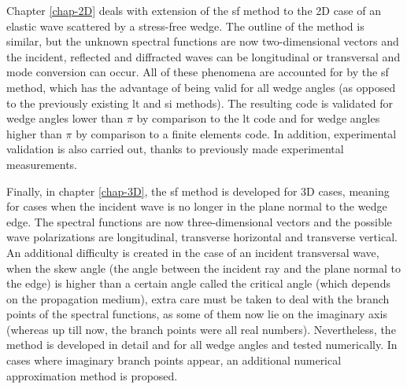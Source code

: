Chapter \ref{chap-2D} deals with extension of the \acrlong{sf} method to the 2D case of an elastic wave scattered by a stress-free wedge. The outline of the method is similar, but the unknown spectral functions are now two-dimensional vectors and the incident, reflected and diffracted waves can be longitudinal or transversal and mode conversion can occur. All of these phenomena are accounted for by the \acrlong{sf} method, which has the advantage of being valid for all wedge angles (as opposed to the previously existing \acrfull{lt} and \acrfull{si} methods). The resulting code is validated for wedge angles lower than $\pi$ by comparison to the \acrshort{lt} code and for wedge angles higher than $\pi$ by comparison to a finite elements code. In addition, experimental validation is also carried out, thanks to previously made experimental measurements.

Finally, in chapter \ref{chap-3D}, the \acrlong{sf} method is developed for 3D cases, meaning for cases when the incident wave is no longer in the plane normal to the wedge edge. The spectral functions are now three-dimensional vectors and the possible wave polarizations are longitudinal, transverse horizontal and transverse vertical. An additional difficulty is created in the case of an incident transversal wave, when the skew angle (the angle between the incident ray and the plane normal to the edge) is higher than a certain angle called the critical angle (which depends on the propagation medium), extra care must be taken to deal with the branch points of the spectral functions, as some of them now lie on the imaginary axis (whereas up till now, the branch points were all real numbers). Nevertheless, the method is developed in detail and for all wedge angles and tested numerically. In cases where imaginary branch points appear, an additional numerical approximation method is proposed.